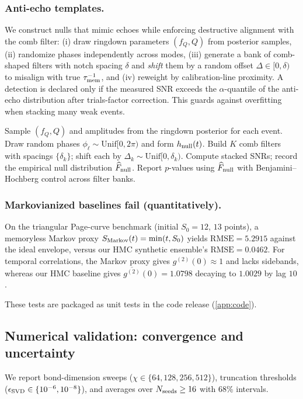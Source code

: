 \documentclass[11pt,a4paper]{article}
\theoremstyle{plain}
\theoremstyle{definition}
\theoremstyle{remark}
\begin{document}
\subsubsection{Anti-echo templates.}
We construct nulls that mimic echoes while enforcing destructive alignment with the comb filter:
(i) draw ringdown parameters $(f_Q,Q)$ from posterior samples, (ii) randomize phases independently across modes,
(iii) generate a bank of comb-shaped filters with notch spacing $\delta$ and \emph{shift} them by a random offset
$\Delta\in[0,\delta)$ to misalign with true $\tau_{\rm mem}^{-1}$, and (iv) reweight by calibration-line proximity.
A detection is declared only if the measured SNR exceeds the $\alpha$-quantile of the anti-echo distribution after
trials-factor correction. This guards against overfitting when stacking many weak events.

\begin{algorithm}[t!]
\caption{Anti-echo null generation}
\label{alg:anti-echo}
\begin{algorithmic}[1]
\State Sample $(f_Q,Q)$ and amplitudes from the ringdown posterior for each event.
\State Draw random phases $\phi_\ell\sim\mathrm{Unif}[0,2\pi)$ and form $h_{\rm null}(t)$.
\State Build $K$ comb filters with spacings $\{\delta_k\}$; shift each by $\Delta_k\sim\mathrm{Unif}[0,\delta_k)$.
\State Compute stacked SNRs; record the empirical null distribution $\widehat{F}_{\rm null}$.
\State Report $p$-values using $\widehat{F}_{\rm null}$ with Benjamini--Hochberg control across filter banks.
\end{algorithmic}
\end{algorithm}

\subsubsection{Markovianized baselines fail (quantitatively).} On the triangular Page-curve benchmark (initial $S_0=12$, $13$ points), a memoryless Markov proxy $S_{\rm Markov}(t)=\min(t,S_0)$ yields $\mathrm{RMSE}=5.2915$ against the ideal envelope, versus our HMC synthetic ensemble's $\mathrm{RMSE}=0.0462$. For temporal correlations, the Markov proxy gives $g^{(2)}(0)\approx 1$ and lacks sidebands, whereas our HMC baseline gives $\overline{g^{(2)}}(0)=1.0798$ decaying to $1.0029$ by lag $10$.

These tests are packaged as unit tests in the code release (\cref{app:code}).


\subsection*{Numerical validation: convergence and uncertainty}
We report bond-dimension sweeps ($\chi\in\{64,128,256,512\}$), truncation thresholds
($\epsilon_{\rm SVD}\in\{10^{-6},10^{-8}\}$), and averages over $N_{\rm seeds}\ge 16$ with 68\% intervals.
\end{document}

